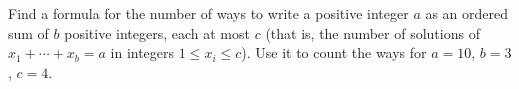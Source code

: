 Find a formula for the number of ways to write a positive integer $a$ as an ordered sum of $b$ positive integers, each at most $c$ (that is, the number of solutions of $x_1+\cdots+x_b=a$ in integers $1\le x_i\le c$). Use it to count the ways for $a=10$, $b=3$, $c=4$.
